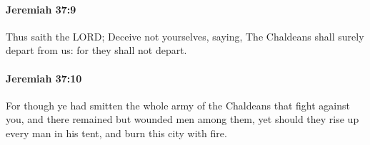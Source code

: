 		\paragraph{Jeremiah 37:9} %
			\label{JEREMIAH-37-9}

			Thus saith the LORD; Deceive not yourselves, saying, The Chaldeans shall surely depart from us: for they shall not depart.


		\paragraph{Jeremiah 37:10} %
			\label{JEREMIAH-37-10}

			For though ye had smitten the whole army of the Chaldeans that fight against you, and there remained but wounded men among them, yet should they rise up every man in his tent, and burn this city with fire.



